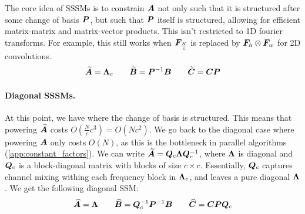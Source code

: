 \documentclass{article}
\begin{document}
The core idea of SSSMs is to constrain $\bm{A}$ not only such that it is structured after some change of basis $\bm{P}$, but such that $\bm{P}$ itself is structured, allowing for efficient matrix-matrix and matrix-vector products. This isn't restricted to 1D fourier transforms. For example, this still works when $\bm{F}_{\frac{N}{c}}$ is replaced by $\bm{F}_h \otimes \bm{F}_w$ for 2D convolutions.
%
\begin{align}
\label{eq:ssm:spectral}
\widetilde{\bm{A}} = \bm{\Lambda}_c \qquad \widetilde{\bm{B}} = \bm{P}^{-1} \bm{B} \qquad \widetilde{\bm{C}} = \bm{C} \bm{P}
\end{align}

\paragraph{Diagonal SSSMs.} At this point, we have  where the change of basis is structured. This means that powering $\widetilde{\bm{A}}$ costs $O(\frac{N}{c} c^3) = O(N c^2)$. We go back to the diagonal case where powering $\bm{A}$ only costs $O(N)$, as this is the bottleneck in parallel algorithms (\cref{app:constant_factors}). We can write $\widetilde{\bm{A}} = \bm{Q}_c \bm{\Lambda} \bm{Q}_c^{-1}$, where $\bm{\Lambda}$ is diagonal and $\bm{Q}_c$ is a block-diagonal matrix with blocks of size $c \!\times\! c$. Essentially, $\bm{Q}_c$ captures channel mixing withing each frequency block in $\bm{\Lambda}_c$, and leaves a pure diagonal $\bm{\Lambda}$. We get the following diagonal SSM:
%
\begin{align}
\label{eq:ssm:diagonal_spectral}
\widehat{\bm{A}} = \bm{\Lambda} \qquad \widehat{\bm{B}} = \bm{Q}_c^{-1} \bm{P}^{-1} \bm{B} \qquad \widehat{\bm{C}} = \bm{C} \bm{P} \bm{Q}_c
\end{align}
\end{document}
